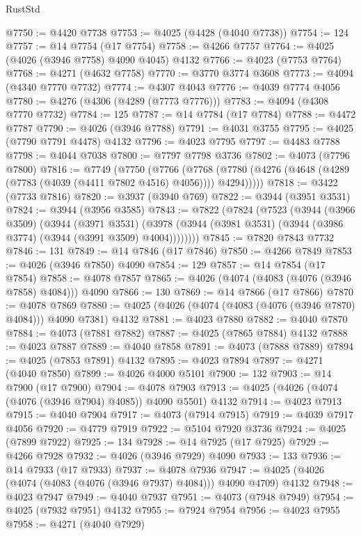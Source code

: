 \begin{lexlean}{RustStd}
\begin{coremodule}
@7750 := @4420 @7738
@7753 := @4025 (@4428 (@4040 @7738))
@7754 := 124
@7757 := @14 @7754 (@17 @7754)
@7758 := @4266 @7757
@7764 := @4025 (@4026 (@3946 @7758) @4090 @4045) @4132
@7766 := @4023 (@7753 @7764)
@7768 := @4271 (@4632 @7758)
@7770 := @3770 @3774 @3608
@7773 := @4094 (@4340 @7770 @7732)
@7774 := @4307 @4043
@7776 := @4039 @7774 @4056
@7780 := @4276 (@4306 (@4289 (@7773 @7776)))
@7783 := @4094 (@4308 @7770 @7732)
@7784 := 125
@7787 := @14 @7784 (@17 @7784)
@7788 := @4472 @7787
@7790 := @4026 (@3946 @7788)
@7791 := @4031 @3755
@7795 := @4025 (@7790 @7791 @4478) @4132
@7796 := @4023 @7795
@7797 := @4483 @7788
@7798 := @4044 @7038
@7800 := @7797 @7798 @3736
@7802 := @4073 (@7796 @7800)
@7816 := @7749
    (@7750
      (@7766
        (@7768 (@7780 (@4276 (@4648 (@4289 (@7783 (@4039 (@4411 @7802 @4516) @4056)))) @4294)))))
@7818 := @3422 (@7733 @7816)
@7820 := @3937 (@3940 @769)
@7822 := @3944 (@3951 @3531)
@7824 := @3944 (@3956 @3585)
@7843 := @7822
    (@7824
      (@7523
        (@3944
          (@3966 @3509)
          (@3944
            (@3971 @3531)
            (@3978 (@3944 (@3981 @3531) (@3944 (@3986 @3774) (@3944 (@3991 @3509) @4004))))))))
@7845 := @7820 @7843 @7732
@7846 := 131
@7849 := @14 @7846 (@17 @7846)
@7850 := @4266 @7849
@7853 := @4026 (@3946 @7850) @4090
@7854 := 129
@7857 := @14 @7854 (@17 @7854)
@7858 := @4078 @7857
@7865 := @4026 (@4074 (@4083 (@4076 (@3946 @7858) @4084))) @4090
@7866 := 130
@7869 := @14 @7866 (@17 @7866)
@7870 := @4078 @7869
@7880 := @4025 (@4026 (@4074 (@4083 (@4076 (@3946 @7870) @4084))) @4090 @7381) @4132
@7881 := @4023 @7880
@7882 := @4040 @7870
@7884 := @4073 (@7881 @7882)
@7887 := @4025 (@7865 @7884) @4132
@7888 := @4023 @7887
@7889 := @4040 @7858
@7891 := @4073 (@7888 @7889)
@7894 := @4025 (@7853 @7891) @4132
@7895 := @4023 @7894
@7897 := @4271 (@4040 @7850)
@7899 := @4026 @4000 @5101
@7900 := 132
@7903 := @14 @7900 (@17 @7900)
@7904 := @4078 @7903
@7913 := @4025 (@4026 (@4074 (@4076 (@3946 @7904) @4085)) @4090 @5501) @4132
@7914 := @4023 @7913
@7915 := @4040 @7904
@7917 := @4073 (@7914 @7915)
@7919 := @4039 @7917 @4056
@7920 := @4779 @7919
@7922 := @5104 @7920 @3736
@7924 := @4025 (@7899 @7922)
@7925 := 134
@7928 := @14 @7925 (@17 @7925)
@7929 := @4266 @7928
@7932 := @4026 (@3946 @7929) @4090
@7933 := 133
@7936 := @14 @7933 (@17 @7933)
@7937 := @4078 @7936
@7947 := @4025 (@4026 (@4074 (@4083 (@4076 (@3946 @7937) @4084))) @4090 @4709) @4132
@7948 := @4023 @7947
@7949 := @4040 @7937
@7951 := @4073 (@7948 @7949)
@7954 := @4025 (@7932 @7951) @4132
@7955 := @7924 @7954
@7956 := @4023 @7955
@7958 := @4271 (@4040 @7929)

\end{coremodule}
\end{lexlean}

